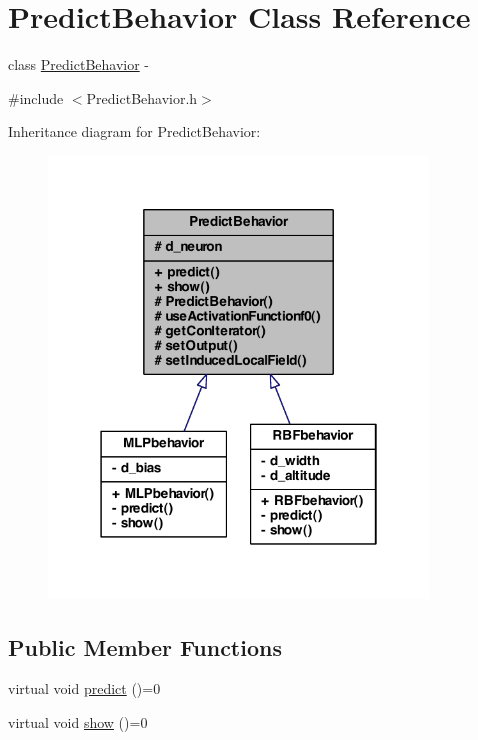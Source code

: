 \hypertarget{class_predict_behavior}{
\section{PredictBehavior Class Reference}
\label{class_predict_behavior}
}


class \hyperlink{class_predict_behavior}{PredictBehavior} -\/  




{\ttfamily \#include $<$PredictBehavior.h$>$}



Inheritance diagram for PredictBehavior:
\nopagebreak
\begin{figure}[H]
\begin{center}
\leavevmode
\includegraphics[width=286pt]{class_predict_behavior__inherit__graph}
\end{center}
\end{figure}
\subsection*{Public Member Functions}
\begin{DoxyCompactItemize}
\item 
virtual void \hyperlink{class_predict_behavior_a7db41238d6d1dbf60c67cf8575e79885}{predict} ()=0
\item 
virtual void \hyperlink{class_predict_behavior_a9ef84360f73784248d994fa4707c1dde}{show} ()=0
\end{DoxyCompactItemize}
